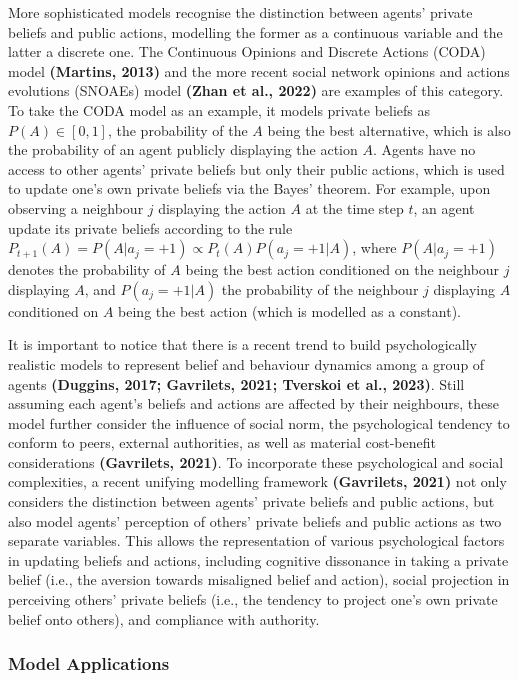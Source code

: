 \documentclass[
  11pt,
]{article}
\begin{document}
More sophisticated models recognise the distinction between agents'
private beliefs and public actions, modelling the former as a continuous
variable and the latter a discrete one. The Continuous Opinions and
Discrete Actions (CODA) model \textbf{(Martins, 2013)} and the more
recent social network opinions and actions evolutions (SNOAEs) model
\textbf{(Zhan et al., 2022)} are examples of this category. To take the
CODA model as an example, it models private beliefs as
\(P(A) \in [0,1]\), the probability of the \(A\) being the best
alternative, which is also the probability of an agent publicly
displaying the action \(A\). Agents have no access to other agents'
private beliefs but only their public actions, which is used to update
one's own private beliefs via the Bayes' theorem. For example, upon
observing a neighbour \(j\) displaying the action \(A\) at the time step
\(t\), an agent update its private beliefs according to the rule
\(P_{t+1}(A) = P(A | a_j = +1) \propto P_t(A) P(a_j = +1 | A)\), where
\(P(A | a_j = +1)\) denotes the probability of \(A\) being the best
action conditioned on the neighbour \(j\) displaying \(A\), and
\(P(a_j = +1 | A)\) the probability of the neighbour \(j\) displaying
\(A\) conditioned on \(A\) being the best action (which is modelled as a
constant).

It is important to notice that there is a recent trend to build
psychologically realistic models to represent belief and behaviour
dynamics among a group of agents \textbf{(Duggins, 2017; Gavrilets,
2021; Tverskoi et al., 2023)}. Still assuming each agent's beliefs and
actions are affected by their neighbours, these model further consider
the influence of social norm, the psychological tendency to conform to
peers, external authorities, as well as material cost-benefit
considerations \textbf{(Gavrilets, 2021)}. To incorporate these
psychological and social complexities, a recent unifying modelling
framework \textbf{(Gavrilets, 2021)} not only considers the distinction
between agents' private beliefs and public actions, but also model
agents' perception of others' private beliefs and public actions as two
separate variables. This allows the representation of various
psychological factors in updating beliefs and actions, including
cognitive dissonance in taking a private belief (i.e., the aversion
towards misaligned belief and action), social projection in perceiving
others' private beliefs (i.e., the tendency to project one's own private
belief onto others), and compliance with authority.

\hypertarget{model-applications}{%
\subsubsection{Model Applications}\label{model-applications}}
\end{document}
